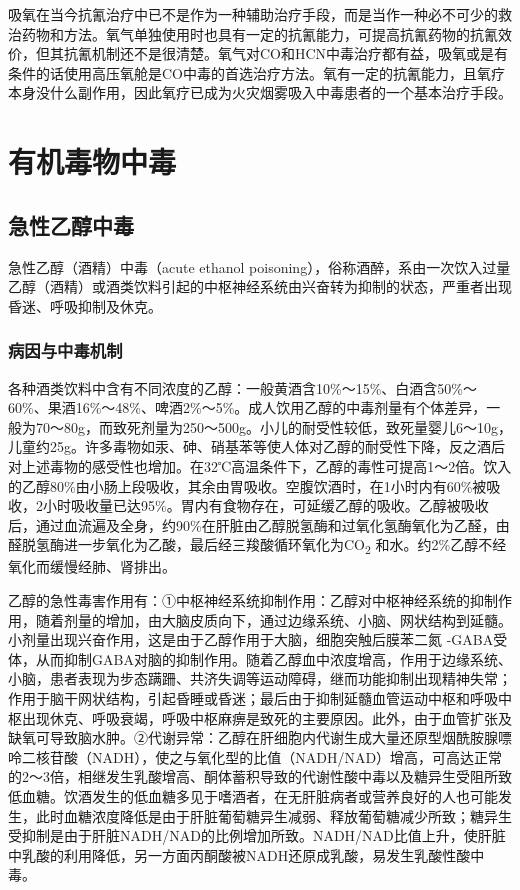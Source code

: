 吸氧在当今抗氰治疗中已不是作为一种辅助治疗手段，而是当作一种必不可少的救治药物和方法。氧气单独使用时也具有一定的抗氰能力，可提高抗氰药物的抗氰效价，但其抗氰机制还不是很清楚。氧气对CO和HCN中毒治疗都有益，吸氧或是有条件的话使用高压氧舱是CO中毒的首选治疗方法。氧有一定的抗氰能力，且氧疗本身没什么副作用，因此氧疗已成为火灾烟雾吸入中毒患者的一个基本治疗手段。

\protect\hypertarget{text00151.html}{}{}

\chapter{有机毒物中毒}

\section{急性乙醇中毒}

急性乙醇（酒精）中毒（acute ethanol
poisoning），俗称酒醉，系由一次饮入过量乙醇（酒精）或酒类饮料引起的中枢神经系统由兴奋转为抑制的状态，严重者出现昏迷、呼吸抑制及休克。

\subsection{病因与中毒机制}

各种酒类饮料中含有不同浓度的乙醇：一般黄酒含10\%～15\%、白酒含50\%～60\%、果酒16\%～48\%、啤酒2\%～5\%。成人饮用乙醇的中毒剂量有个体差异，一般为70～80g，而致死剂量为250～500g。小儿的耐受性较低，致死量婴儿6～10g，儿童约25g。许多毒物如汞、砷、硝基苯等使人体对乙醇的耐受性下降，反之酒后对上述毒物的感受性也增加。在32℃高温条件下，乙醇的毒性可提高1～2倍。饮入的乙醇80\%由小肠上段吸收，其余由胃吸收。空腹饮酒时，在1小时内有60\%被吸收，2小时吸收量已达95\%。胃内有食物存在，可延缓乙醇的吸收。乙醇被吸收后，通过血流遍及全身，约90\%在肝脏由乙醇脱氢酶和过氧化氢酶氧化为乙醛，由醛脱氢酶进一步氧化为乙酸，最后经三羧酸循环氧化为CO\textsubscript{2}
和水。约2\%乙醇不经氧化而缓慢经肺、肾排出。

乙醇的急性毒害作用有：①中枢神经系统抑制作用：乙醇对中枢神经系统的抑制作用，随着剂量的增加，由大脑皮质向下，通过边缘系统、小脑、网状结构到延髓。小剂量出现兴奋作用，这是由于乙醇作用于大脑，细胞突触后膜苯二氮{}
-GABA受体，从而抑制GABA对脑的抑制作用。随着乙醇血中浓度增高，作用于边缘系统、小脑，患者表现为步态蹒跚、共济失调等运动障碍，继而功能抑制出现精神失常；作用于脑干网状结构，引起昏睡或昏迷；最后由于抑制延髓血管运动中枢和呼吸中枢出现休克、呼吸衰竭，呼吸中枢麻痹是致死的主要原因。此外，由于血管扩张及缺氧可导致脑水肿。②代谢异常：乙醇在肝细胞内代谢生成大量还原型烟酰胺腺嘌呤二核苷酸（NADH），使之与氧化型的比值（NADH/NAD）增高，可高达正常的2～3倍，相继发生乳酸增高、酮体蓄积导致的代谢性酸中毒以及糖异生受阻所致低血糖。饮酒发生的低血糖多见于嗜酒者，在无肝脏病者或营养良好的人也可能发生，此时血糖浓度降低是由于肝脏葡萄糖异生减弱、释放葡萄糖减少所致；糖异生受抑制是由于肝脏NADH/NAD的比例增加所致。NADH/NAD比值上升，使肝脏中乳酸的利用降低，另一方面丙酮酸被NADH还原成乳酸，易发生乳酸性酸中毒。

